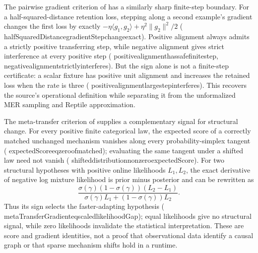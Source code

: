 \documentclass[11pt]{article}
\newcommand{\leanname}[1]{{\scriptsize\ttfamily
  \def\_{\textunderscore\allowbreak}#1}}
\begin{document}
The pairwise gradient criterion of \cite{riemer2019mer} has a similarly sharp
finite-step boundary.  For a half-squared-distance retention loss, stepping
along a second example's gradient changes the first loss by exactly
$-\eta\langle g_1,g_2\rangle+\eta^2\lVert g_2\rVert^2/2$
(\leanname{halfSquaredDistance\_gradientStep\_change\_exact}).  Positive
alignment always admits a strictly positive transferring step, while negative
alignment gives strict interference at every positive step
(\leanname{positive\_alignment\_has\_safe\_finite\_step},
\leanname{negative\_alignment\_strictly\_interferes}).  But the sign alone is
not a finite-step certificate: a scalar fixture has positive unit alignment
and increases the retained loss when the rate is three
(\leanname{positive\_alignment\_large\_step\_interferes}).  This
recovers the source's operational definition while separating it from the
unformalized MER sampling and Reptile approximation.

The meta-transfer criterion of \cite{bengio2019metatransfer} supplies a
complementary signal for structural change.  For every positive finite
categorical law, the expected score of a correctly matched unchanged mechanism
vanishes along every probability-simplex tangent
(\leanname{expectedScore\_eq\_zero\_of\_matched}); evaluating the same tangent
under a shifted law need not vanish
(\leanname{shifted\_distribution\_nonzero\_expectedScore}).  For two
structural hypotheses with positive online likelihoods $L_1,L_2$, the exact
derivative of negative log mixture likelihood is prior minus posterior and
can be rewritten as
\[
 \frac{\sigma(\gamma)(1-\sigma(\gamma))(L_2-L_1)}
      {\sigma(\gamma)L_1+(1-\sigma(\gamma))L_2}.
\]
Thus its sign selects the faster-adapting hypothesis
(\leanname{metaTransferGradient\_eq\_scaled\_likelihoodGap}); equal
likelihoods give no structural signal, while zero likelihoods invalidate the
statistical interpretation.  These are score and gradient identities, not a
proof that observational data identify a causal graph or that sparse
mechanism shifts hold in a runtime.
\end{document}
